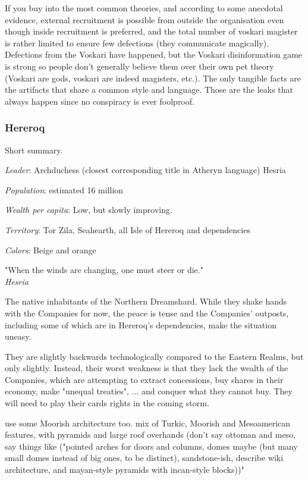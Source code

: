 If you buy into the most common theories, and according to some anecdotal evidence, external recruitment is possible from outside the organisation even though inside recruitment is preferred, and the total number of voskari magister is rather limited to ensure few defections (they communicate magically). Defections from the Voskari have happened, but the Voskari disinformation game is strong so people don't generally believe them over their own pet theory (Voskari are gods, voskari are indeed magisters, etc.). The only tangible facts are the artifacts that share a common style and language. Those are the leaks that always happen since no conspiracy is ever foolproof.





\subsubsection{Hereroq}


Short summary.


\textit{Leader}: Archduchess (closest corresponding title in Atheryn language) Hesria

\textit{Population}: estimated 16 million

\textit{Wealth per capita}: Low, but slowly improving.

\textit{Territory}: Tor Zila, Seahearth, all Isle of Hereroq and dependencies
    
\textit{Colors}: Beige and orange


\begin{rpg-quotebox}
    "When the winds are changing, one must steer or die." \\ \textendash \textit{Hesria}
    \end{rpg-quotebox}


The native inhabitants of the Northern Dreamshard. While they shake hands with the Companies for now, the peace is tense and the Companies' outposts, including some of which are in Hereroq's dependencies, make the situation uneasy.


They are slightly backwards technologically compared to the Eastern Realms, but only slightly. Instead, their worst weakness is that they lack the wealth of the Companies, which are attempting to extract concessions, buy shares in their economy, make "unequal treaties", ... and conquer what they cannot buy. They will need to play their cards rights in the coming storm. 

use some Moorish architecture too. mix of Turkic, Moorish and Mesoamerican features, with pyramids and large roof overhands (don't say ottoman and meso, say things like ("pointed arches for doors and columns, domes maybe (but many small domes instead of big ones, to be distinct), sandstone-ish, describe wiki architecture, and mayan-style pyramids with incan-style blocks))"

